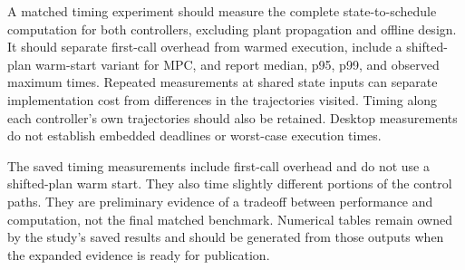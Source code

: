 \documentclass[11pt,a4paper]{article}
\begin{document}
\begin{table}[htbp]
    \centering
    \small
    
    \caption{Saved 100-cycle costs, sustained threshold times, and host timings.
    Timings include first-call overhead. Daniel times feedback and conditioning;
    MPC-5 times its QP solve.}
    \label{tab:mpc-summary}
\end{table}
\FloatBarrier

A matched timing experiment should measure the complete state-to-schedule
computation for both controllers, excluding plant propagation and offline
design. It should separate first-call overhead from warmed execution, include
a shifted-plan warm-start variant for MPC, and report median, p95, p99, and
observed maximum times. Repeated measurements at shared state inputs can
separate implementation cost from differences in the trajectories visited.
Timing along each controller's own trajectories should also be retained.
Desktop measurements do not establish embedded deadlines or worst-case
execution times.

The saved timing measurements include first-call overhead and do not use a
shifted-plan warm start. They also time slightly different portions of the
control paths. They are preliminary evidence of a tradeoff between performance and
computation, not the final matched benchmark. Numerical tables remain owned by
the study's saved results and should be generated from those outputs when the
expanded evidence is ready for publication.
\end{document}
